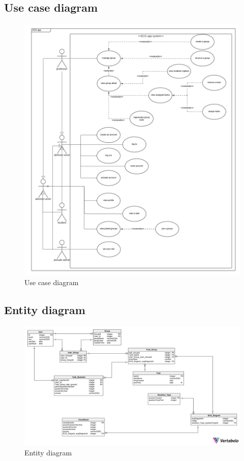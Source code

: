 \documentclass[singlespacing,12pt,parskip,headsepline,consistentlayout]{article}
\begin{document}
\begin{center}
\end{center}


\subsection{Use case diagram}
\begin{figure}[H]
    \centering
    \includegraphics[width=\textwidth,height=\textheight,keepaspectratio]{img/PRO - diagrams.png}
    \caption{Use case diagram}
\end{figure}


\pagebreak

\subsection{Entity diagram}
\begin{figure}[H]
    \centering
    \includegraphics[width=\textwidth,height=\textheight,keepaspectratio]{img/project_database-2023-01-06_14-26.png}
    \caption{Entity diagram}
\end{figure}
\pagebreak
\end{document}
